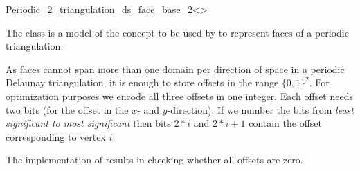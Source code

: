 

\begin{ccRefClass}{Periodic_2_triangulation_ds_face_base_2<>}

\ccDefinition

The class  is a model of
the concept  to be used by
 to represent faces of a periodic
triangulation.

As faces cannot span more than one domain per direction of space in a
periodic Delaunay triangulation, it is enough to store offsets in the
range $\{0,1\}^2$. For optimization purposes we encode all three
offsets in one integer. Each offset needs two bits (for the offset in
the $x$- and $y$-direction). If we number the bits from {\em least
  significant to most significant} then bits $2*i$ and $2*i+1$ contain
the offset corresponding to vertex $i$.

The implementation of  results in checking
whether all offsets are zero.


\ccIsModel {}

\ccSeeAlso

\\
\\

\end{ccRefClass}
